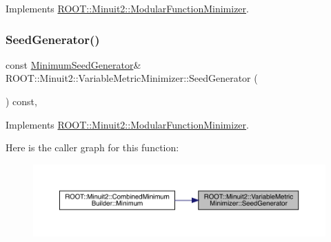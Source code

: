 Implements \mbox{\hyperlink{classROOT_1_1Minuit2_1_1ModularFunctionMinimizer_a13e98551cf14e927c61e1e34ecf8ba8b}{R\+O\+O\+T\+::\+Minuit2\+::\+Modular\+Function\+Minimizer}}.

\mbox{\label{classROOT_1_1Minuit2_1_1VariableMetricMinimizer_a8ac2123142283dd05611842236caeadb}} 
\subsubsection{\texorpdfstring{SeedGenerator()}{SeedGenerator()}\hspace{0.1cm}{\footnotesize\ttfamily [1/3]}}
{\footnotesize\ttfamily const \mbox{\hyperlink{classROOT_1_1Minuit2_1_1MinimumSeedGenerator}{Minimum\+Seed\+Generator}}\& R\+O\+O\+T\+::\+Minuit2\+::\+Variable\+Metric\+Minimizer\+::\+Seed\+Generator (\begin{DoxyParamCaption}{ }\end{DoxyParamCaption}) const\hspace{0.3cm}{\ttfamily [inline]}, {\ttfamily [virtual]}}



Implements \mbox{\hyperlink{classROOT_1_1Minuit2_1_1ModularFunctionMinimizer_a742930de97b0ce9ba23773874ae0894b}{R\+O\+O\+T\+::\+Minuit2\+::\+Modular\+Function\+Minimizer}}.

Here is the caller graph for this function\+:
\nopagebreak
\begin{figure}[H]
\begin{center}
\leavevmode
\includegraphics[width=350pt]{d7/d5b/classROOT_1_1Minuit2_1_1VariableMetricMinimizer_a8ac2123142283dd05611842236caeadb_icgraph}
\end{center}
\end{figure}
\mbox{\label{classROOT_1_1Minuit2_1_1VariableMetricMinimizer_a8ac2123142283dd05611842236caeadb}} 
